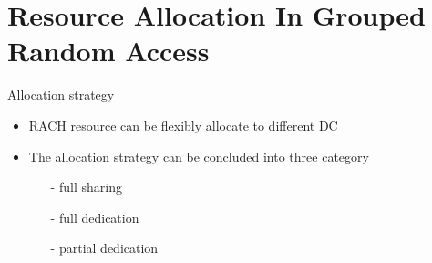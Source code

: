 \documentclass{beamer}
\begin{document}
\section{Resource Allocation In Grouped Random Access}
\begin{frame} {Allocation strategy}
    \begin{itemize}
        \item {RACH resource can be flexibly allocate to different DC}
        \item {The allocation strategy can be concluded into three category}
        \begin{itemize}
            \item [-] {full sharing}
            \item [-] {full dedication}
            \item [-] {partial dedication}
        \end{itemize}
    \end{itemize}
\end{frame}
\end{document}
